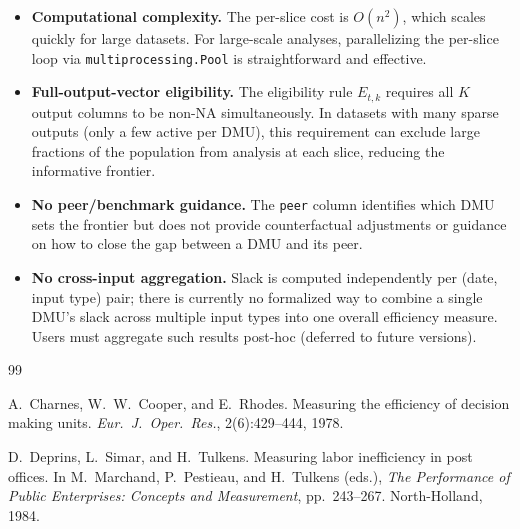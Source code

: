 \documentclass[11pt]{article}
\theoremstyle{definition}
\theoremstyle{plain}
\theoremstyle{remark}
\begin{document}
\begin{itemize}
\item \textbf{Computational complexity.} The per-slice cost is $O(n^2)$, which scales quickly for large datasets.
  For large-scale analyses, parallelizing the per-slice loop via \texttt{multiprocessing.Pool} is straightforward and effective.

\item \textbf{Full-output-vector eligibility.} The eligibility rule $E_{t,k}$ requires all $K$ output columns to be non-NA simultaneously.
  In datasets with many sparse outputs (only a few active per DMU), this requirement can exclude large fractions of the population
  from analysis at each slice, reducing the informative frontier.

\item \textbf{No peer/benchmark guidance.} The \texttt{peer} column identifies which DMU sets the frontier but does not
  provide counterfactual adjustments or guidance on how to close the gap between a DMU and its peer.

\item \textbf{No cross-input aggregation.} Slack is computed independently per (date, input type) pair; there is currently no formalized way
  to combine a single DMU's slack across multiple input types into one overall efficiency measure. Users must aggregate such results post-hoc
  (deferred to future versions).
\end{itemize}

\begin{thebibliography}{99}

A.~Charnes, W.~W.~Cooper, and E.~Rhodes.
\newblock Measuring the efficiency of decision making units.
\newblock \textit{Eur.~J.~Oper.~Res.}, 2(6):429--444, 1978.

D.~Deprins, L.~Simar, and H.~Tulkens.
\newblock Measuring labor inefficiency in post offices.
\newblock In M.~Marchand, P.~Pestieau, and H.~Tulkens (eds.), \textit{The Performance of Public Enterprises: Concepts and Measurement}, pp.~243--267.
\newblock North-Holland, 1984.

\end{thebibliography}
\end{document}
